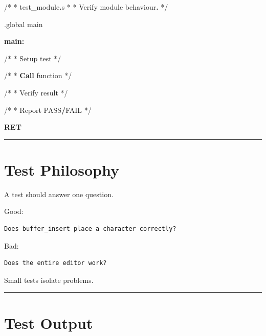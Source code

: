 \documentclass[
  oneside,
  openany]{book}
\newenvironment{Shaded}{\begin{snugshade}}{\end{snugshade}}
\newcommand{\ControlFlowTok}[1]{\textcolor[rgb]{0.13,0.29,0.53}{\textbf{#1}}}
\newcommand{\FunctionTok}[1]{\textcolor[rgb]{0.13,0.29,0.53}{\textbf{#1}}}
\newcommand{\NormalTok}[1]{#1}
\newcommand{\OperatorTok}[1]{\textcolor[rgb]{0.81,0.36,0.00}{\textbf{#1}}}
\begin{document}
\begin{Shaded}
\begin{Highlighting}[]
\NormalTok{/*}
\NormalTok{ * test\_module}\OperatorTok{.}\NormalTok{s}
\NormalTok{ *}
\NormalTok{ * Verify module behaviour}\OperatorTok{.}
\NormalTok{ */}


\NormalTok{.global main}


\FunctionTok{main:}

\NormalTok{    /*}
\NormalTok{     * Setup test}
\NormalTok{     */}


\NormalTok{    /*}
\NormalTok{     * }\ControlFlowTok{Call}\NormalTok{ function}
\NormalTok{     */}


\NormalTok{    /*}
\NormalTok{     * Verify result}
\NormalTok{     */}


\NormalTok{    /*}
\NormalTok{     * Report PASS}\OperatorTok{/}\NormalTok{FAIL}
\NormalTok{     */}


    \ControlFlowTok{RET}
\end{Highlighting}
\end{Shaded}

\begin{center}\rule{0.5\linewidth}{0.5pt}\end{center}

\hypertarget{test-philosophy}{%
\section{Test Philosophy}\label{test-philosophy}}

A test should answer one question.

Good:

\begin{verbatim}
Does buffer_insert place a character correctly?
\end{verbatim}

Bad:

\begin{verbatim}
Does the entire editor work?
\end{verbatim}

Small tests isolate problems.

\begin{center}\rule{0.5\linewidth}{0.5pt}\end{center}

\hypertarget{test-output}{%
\section{Test Output}\label{test-output}}
\end{document}
